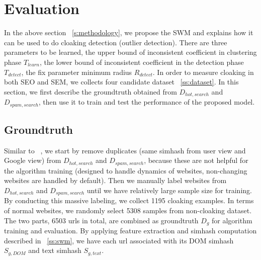 \section{Evaluation}
\label{s:evaluation}



In the above section ~\autoref{s:methodology}, we propose the SWM and explains
how it can be used to do cloaking detection (outlier detection). There are three
parameters to be learned, the upper bound of inconsistent coefficient in
clustering phase $T_{learn}$, the lower bound of inconsistent coefficient in the detection
phase $T_{detect}$, the fix parameter minimum radius $R_{detect}$. 
In order to measure cloaking in both SEO and SEM, we collects four candidate dataset
~\autoref{ss:dataset}. In this section,
we first describe the groundtruth obtained from $D_{hot, search}$ and $D_{spam,
search}$, then use it to train and test the performance of the proposed model.

\subsection{Groundtruth}

Similar to ~\cite{lin2009detection}, we start by remove duplicates (same simhash
from user view and Google view) from $D_{hot, search}$ and $D_{spam, search}$,
because these are not helpful for the algorithm training (designed to handle
dynamics of websites, non-changing websites are handled by default). Then we
manually label websites from $D_{hot, search}$ and $D_{spam, search}$ until we
have relatively large sample size for training. By conducting this massive
labeling, we collect 1195 cloaking examples. In terms of normal websites, we randomly
select 5308 samples from non-cloaking dataset. The two parts, 6503 urls in
total, are combined as groundtruth $D_{g}$ for algorithm training and evaluation.
By applying feature extraction and simhash computation described in
~\autoref{ss:swm}, we have each url associated with its DOM simhash $S_{g, DOM}$ 
and text simhash $S_{g, text}$.

%
%
%
%



